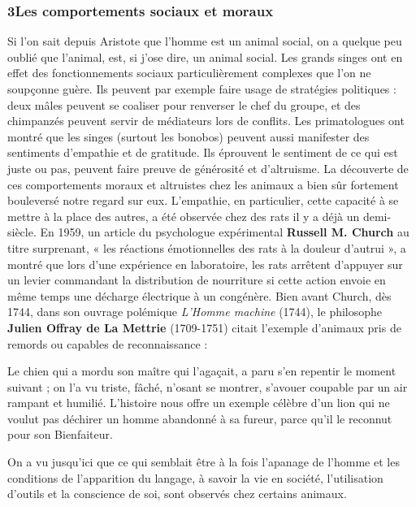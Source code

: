 \subsubsection*{3\quad Les comportements sociaux et moraux}
Si l’on sait depuis Aristote que l’homme est un animal social, on a quelque peu oublié que l’animal, est, si j’ose dire, un animal social. Les grands singes ont en effet des fonctionnements sociaux particulièrement complexes que l’on ne soupçonne guère. Ils peuvent par exemple faire usage de stratégies politiques : deux mâles peuvent se coaliser pour renverser le chef du groupe, et des chimpanzés peuvent servir de médiateurs lors de conflits. Les primatologues ont montré que les singes (surtout les bonobos) peuvent aussi manifester des sentiments d’empathie et de gratitude. Ils éprouvent le sentiment de ce qui est juste ou pas, peuvent faire preuve de générosité et d’altruisme. La découverte de ces comportements moraux et altruistes chez les animaux a bien sûr fortement bouleversé notre regard sur eux. L’empathie, en particulier, cette capacité à se mettre à la place des autres, a été observée chez des rats il y a déjà un demi-siècle. En 1959, un article du psychologue expérimental \textbf{Russell M. Church} au titre surprenant, « les réactions émotionnelles des rats à la douleur d’autrui », a montré que lors d’une expérience en laboratoire, les rats arrêtent d’appuyer sur un levier commandant la distribution de nourriture si cette action envoie en même temps une décharge électrique à un congénère. Bien avant Church, dès 1744, dans son ouvrage polémique \textit{L’Homme machine} (1744), le philosophe \textbf{Julien Offray de La Mettrie} (1709-1751) citait l’exemple d’animaux pris de remords ou capables de reconnaissance :
\begin{lecture}{}
Le chien qui a mordu son maître qui l’agaçait, a paru s’en repentir le moment suivant ; on l’a vu triste, fâché, n’osant se montrer, s’avouer coupable par un air rampant et humilié. L’histoire nous offre un exemple célèbre d’un lion qui ne voulut pas déchirer un homme abandonné à sa fureur, parce qu’il le reconnut pour son Bienfaiteur.
\end{lecture}
On a vu jusqu’ici que ce qui semblait être à la fois l’apanage de l’homme et les conditions de l’apparition du langage, à savoir la vie en société, l’utilisation d’outils et la conscience de soi, sont observés chez certains animaux.

